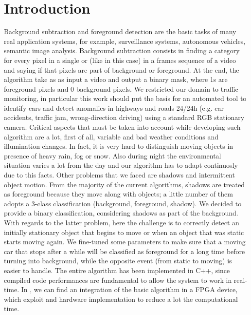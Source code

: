 \section*{Introduction}
Background subtraction and foreground detection are the basic tasks of many real application systems,
for example, surveillance systems, autonomous vehicles, semantic image analysis. Background subtraction
consists in finding a category for every pixel in a single or (like in this case) in a frames sequence
of a video and saying if that pixels are part of background or foreground. At the end, the algorithm take as
as input a video and output a binary mask, where 1s are foreground pixels and 0 background pixels.
We restricted our domain to traffic monitoring, in particular this work should put the basis for an automated
tool to identify cars and detect anomalies in highways and roads 24/24h (e.g. car accidents,
traffic jam, wrong-direction driving) using a standard RGB stationary camera.
Critical aspects that must be taken into account while developing such algorithm are a lot, first of all,
variable and bad weather conditions and illumination changes. In fact, it is very hard to distinguish
moving objects in presence of heavy rain, fog or snow. Also during night the environmental situation varies
a lot from the day and our algorithm has to adapt continuosly due to this facts. 
Other problems that we faced are shadows and intermittent object motion.
From the majority of the current algorithms, shadows are treated as foreground because they move along with
objects; a little number of them adopts a 3-class classification (background, foreground, shadow). We
decided to provide a binary classification, considering shadows as part of the background. With regards to
the latter problem, here the challenge is to correctly detect an initially stationary object that begins to
move or when an object that was static starts moving again. We fine-tuned some parameters to make sure
that a moving car that stops after a while will be classified as foreground for a long time before turning
into background, while the opposite event (from static to moving) is easier to handle.
The entire algorithm has been implemented in C++, since compiled code performances are fundamental to
allow the system to work in real-time. In \cite{pbas_and_scene_analysis_fpga}, we can find an integration of
the basic algorithm in a FPGA device, which exploit and hardware implementation to reduce a lot the
computational time.


